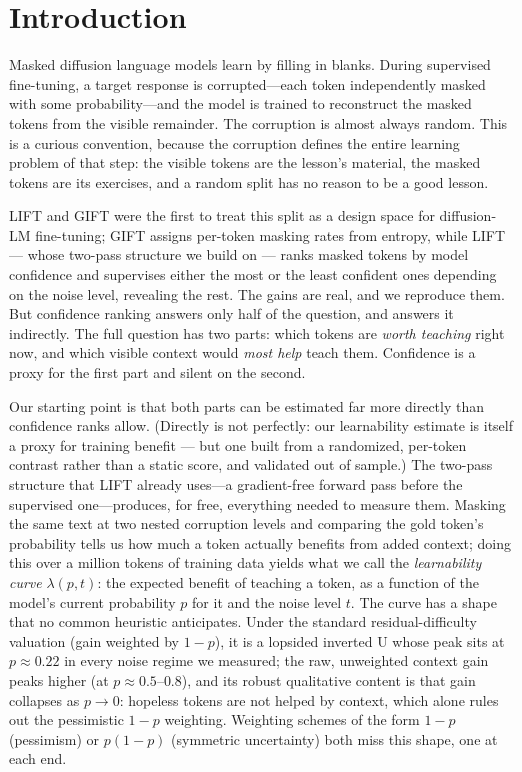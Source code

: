 \documentclass{article} %
\begin{document}
\section{Introduction}

Masked diffusion language models learn by filling in blanks. During supervised fine-tuning, a target response is corrupted---each token independently masked with some probability---and the model is trained to reconstruct the masked tokens from the visible remainder. The corruption is almost always random. This is a curious convention, because the corruption defines the entire learning problem of that step: the visible tokens are the lesson's material, the masked tokens are its exercises, and a random split has no reason to be a good lesson.

LIFT \citep{lift2026} and GIFT \citep{gift2025} were the first to treat this split as a design space for diffusion-LM fine-tuning; GIFT assigns per-token masking rates from entropy, while LIFT --- whose two-pass structure we build on --- ranks masked tokens by model confidence and supervises either the most or the least confident ones depending on the noise level, revealing the rest. The gains are real, and we reproduce them. But confidence ranking answers only half of the question, and answers it indirectly. The full question has two parts: which tokens are \emph{worth teaching} right now, and which visible context would \emph{most help} teach them. Confidence is a proxy for the first part and silent on the second.

Our starting point is that both parts can be estimated far more directly than confidence ranks allow. (Directly is not perfectly: our learnability estimate is itself a proxy for training benefit --- but one built from a randomized, per-token contrast rather than a static score, and validated out of sample.) The two-pass structure that LIFT already uses---a gradient-free forward pass before the supervised one---produces, for free, everything needed to measure them. Masking the same text at two nested corruption levels and comparing the gold token's probability tells us how much a token actually benefits from added context; doing this over a million tokens of training data yields what we call the \emph{learnability curve} $\lambda(p, t)$: the expected benefit of teaching a token, as a function of the model's current probability $p$ for it and the noise level $t$. The curve has a shape that no common heuristic anticipates. Under the standard residual-difficulty valuation (gain weighted by $1-p$), it is a lopsided inverted U whose peak sits at $p \approx 0.22$ in every noise regime we measured; the raw, unweighted context gain peaks higher (at $p \approx 0.5$--$0.8$), and its robust qualitative content is that gain collapses as $p \to 0$: hopeless tokens are not helped by context, which alone rules out the pessimistic $1-p$ weighting. Weighting schemes of the form $1-p$ (pessimism) or $p(1-p)$ (symmetric uncertainty) both miss this shape, one at each end.
\end{document}
